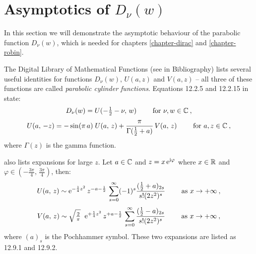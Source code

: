 \section{Asymptotics of \texorpdfstring{$D_\nu(w)$}{Dₙ(w)}}
\label{apdx-parabolic-cylinder-asymp}

In this section we will demonstrate the asymptotic behaviour of the parabolic function $D_\nu(w)$, which is needed for chapters \ref{chapter-dirac} and \ref{chapter-robin}.

The Digital Library of Mathematical Functions (see \citet{DLMF} in Bibliography) lists several useful identities for functions $D_\nu(w), \, U(a, z)$ and $V(a, z)$ – all three of these functions are called \textit{parabolic cylinder functions}. Equations 12.2.5 and 12.2.15 in \citet{DLMF} state:
\begin{gather}
	D_\nu(w) = U(-\tfrac{1}{2} - \nu, \, w)
	\qquad \text{ for } \nu, w \in \mathbb{C}
	\: ,
	\label{eqn-D-via-U}
	\\[3pt]
	U(a, \, -z)
	= - \sin(\pi \, a)
	\; U(a, \, z)
	+ \frac{\pi}{\Gamma(\tfrac{1}{2} + a)}
	\, V(a, \, z)
	\qquad \text{ for } a, z \in \mathbb{C}
	\: ,
	\label{eqn-U-via-U-V}
\end{gather}
where $\Gamma(z)$ is the gamma function.

\citet{DLMF} also lists expansions for large $z$. Let $a\in\mathbb{C}$ and $z = x \, \mathrm{e}^{\mathrm{i} \varphi}$ where $x \in \mathbb{R}$ and $\varphi \in (-\tfrac{3\pi}{4}, \, \tfrac{3\pi}{4})$, then:
\begin{gather}
	U(a, \, z)
	\sim \mathrm{e}^{-\frac{1}{4} z^2} \,
	z^{-a-\frac{1}{2}} \,
	\sum_{s=0}^\infty (-1)^s \frac{(\tfrac{1}{2} + a)_{2s}}{s! (2z^2)^s}
	\qquad \text{ as } x \to +\infty
	\: ,
	\label{eqn-U-asymptotic}
	\\[3pt]
	V(a, \, z)
	\sim \sqrt{\tfrac{2}{\pi}} \;\;
	\mathrm{e}^{+\frac{1}{4} z^2} \,
	z^{+a-\frac{1}{2}} \,
	\sum_{s=0}^\infty \frac{(\tfrac{1}{2} - a)_{2s}}{s! (2z^2)^s}
	\qquad \text{ as } x \to +\infty
	\: ,
	\label{eqn-V-asymptotic}
\end{gather}
where $(a)_s$ is the Pochhammer symbol. These two expansions are listed as 12.9.1 and 12.9.2.

